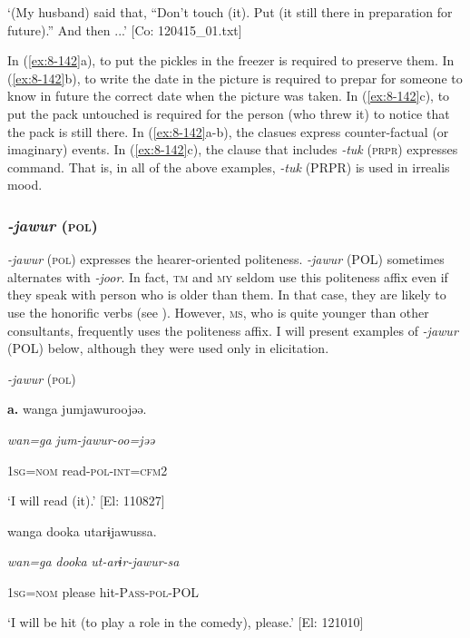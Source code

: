 \glt ‘(My husband) said that, “Don’t touch (it). Put (it still there in preparation for future).” And then ...’ [Co: 120415\_01.txt]
\z

In (\ref{ex:8-142}a), to put the pickles in the freezer is required to preserve them. In (\ref{ex:8-142}b), to write the date in the picture is required to prepar for someone to know in future the correct date when the picture was taken. In (\ref{ex:8-142}c), to put the pack untouched is required for the person (who threw it) to notice that the pack is still there. In (\ref{ex:8-142}a-b), the clasues express counter-factual (or imaginary) events. In (\ref{ex:8-142}c), the clause that includes \textit{-tuk} (\textsc{prpr}) expresses command. That is, in all of the above examples, \textit{{}-tuk} (PRPR) is used in irrealis mood.

\subsubsection{\textit{{}-jawur} (\textsc{pol})}

\textit{{}-jawur} (\textsc{pol}) expresses the hearer-oriented politeness. \textit{{}-jawur} (POL) sometimes alternates with \textit{{}-joor}. In fact, \textsc{tm} and \textsc{my} seldom use this politeness affix even if they speak with person who is older than them. In that case, they are likely to use the honorific verbs (see ). However, \textsc{ms}, who is quite younger than other consultants, frequently uses the politeness affix. I will present examples of \textit{{}-jawur} (POL) below, although they were used only in elicitation.

\ea\label{ex:8-143}
  \textit{{}-jawur} (\textsc{pol})

  \textbf{a.}  {\TM}
\glll  wanga  jumjawuroojəə.

      \textit{wan=ga}  \textit{jum-jawur{}-oo=jəə}

      1\textsc{sg}=\textsc{nom}  read-\textsc{pol}-\textsc{int}=\textsc{cfm}2

\glt ‘I will read (it).’ [El: 110827]

\ex {\TM}
\glll  wanga  dooka  utarɨjawussa.

      \textit{wan=ga}  \textit{dooka}  \textit{ut-arɨr-jawur{}-sa}

      1\textsc{sg}=\textsc{nom}  please  hit-P\textsc{ass}-\textsc{pol}-POL

\glt ‘I will be hit (to play a role in the comedy), please.’ [El: 121010]

